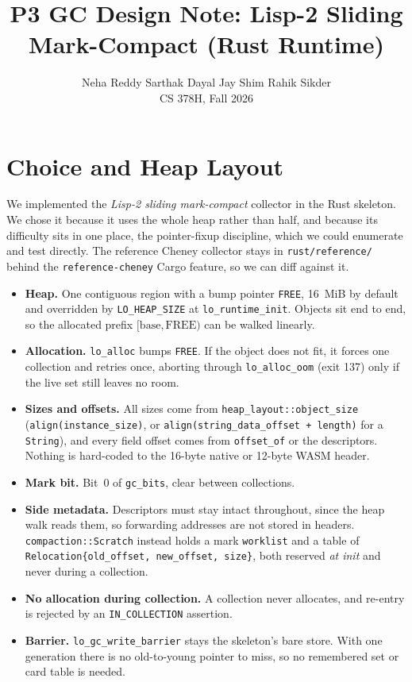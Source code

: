 \documentclass[10pt]{article}
\title{\vspace{-1.2em}\textbf{P3 GC Design Note: Lisp-2 Sliding Mark-Compact (Rust Runtime)}\vspace{-0.4em}}
\author{Neha Reddy \quad Sarthak Dayal \quad Jay Shim \quad Rahik Sikder\\[0.2em] CS 378H, Fall 2026}
\date{}
\newcommand{\code}[1]{\texttt{\small #1}}
\begin{document}
\maketitle
\vspace{-2.2em}

\section{Choice and Heap Layout}
We implemented the \emph{Lisp-2 sliding mark-compact} collector in the Rust skeleton. We chose it because it uses the whole heap rather than half, and because its difficulty sits in one place, the pointer-fixup discipline, which we could enumerate and test directly. The reference Cheney collector stays in \code{rust/reference/} behind the \code{reference-cheney} Cargo feature, so we can diff against it.
\begin{itemize}
  \item \textbf{Heap.} One contiguous region with a bump pointer \code{FREE}, 16~MiB by default and overridden by \code{LO\_HEAP\_SIZE} at \code{lo\_runtime\_init}. Objects sit end to end, so the allocated prefix $[\mathrm{base},\mathrm{FREE})$ can be walked linearly.
  \item \textbf{Allocation.} \code{lo\_alloc} bumps \code{FREE}. If the object does not fit, it forces one collection and retries once, aborting through \code{lo\_alloc\_oom} (exit 137) only if the live set still leaves no room.
  \item \textbf{Sizes and offsets.} All sizes come from \code{heap\_layout::object\_size} (\code{align(instance\_size)}, or \code{align(string\_data\_offset + length)} for a \code{String}), and every field offset comes from \code{offset\_of} or the descriptors. Nothing is hard-coded to the 16-byte native or 12-byte WASM header.
  \item \textbf{Mark bit.} Bit~0 of \code{gc\_bits}, clear between collections.
  \item \textbf{Side metadata.} Descriptors must stay intact throughout, since the heap walk reads them, so forwarding addresses are not stored in headers. \code{compaction::Scratch} instead holds a mark \code{worklist} and a table of \code{Relocation\{old\_offset, new\_offset, size\}}, both reserved \emph{at init} and never during a collection.
  \item \textbf{No allocation during collection.} A collection never allocates, and re-entry is rejected by an \code{IN\_COLLECTION} assertion.
  \item \textbf{Barrier.} \code{lo\_gc\_write\_barrier} stays the skeleton's bare store. With one generation there is no old-to-young pointer to miss, so no remembered set or card table is needed.
\end{itemize}
\end{document}

